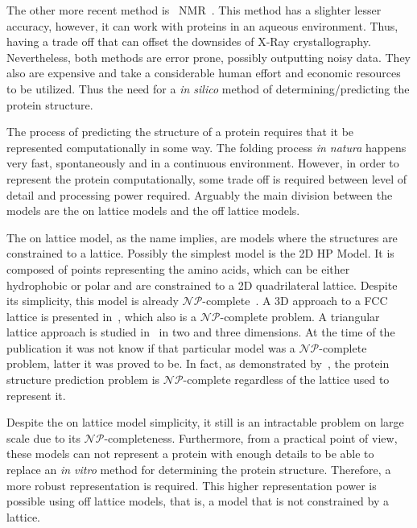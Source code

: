 The other more recent method is ~\ac{NMR}~\cite{nelson2008lehninger}. This
method has a slighter lesser accuracy, however, it can work with proteins in an
aqueous environment. Thus, having a trade off that can offset the downsides of
X-Ray crystallography. Nevertheless, both methods are error prone, possibly
outputting noisy data. They also are expensive and take a considerable human
effort and economic resources to be utilized.  Thus the need for a \textit{in
silico} method of determining/predicting the protein structure.

The process of predicting the structure of a protein requires that it be
represented computationally in some way. The folding process \textit{in natura}
happens very fast, spontaneously and in a continuous environment. However, in
order to represent the protein computationally, some trade off is required
between level of detail and processing power required. Arguably the main
division between the models are the on lattice models and the off lattice
models.

The on lattice model, as the name implies, are models where the structures are
constrained to a lattice. Possibly the simplest model is the 2D \ac{HP} Model.
It is composed of points representing the amino acids, which can be either
hydrophobic or polar and are constrained to a 2D quadrilateral lattice. Despite
its simplicity, this model is already
$\mathcal{NP}$-complete~\cite{berger1998protein}. A 3D approach to a \ac{FCC}
lattice is presented in~\cite{hoque2007protein}, which also is a
$\mathcal{NP}$-complete problem. A triangular lattice approach is studied
in~\cite{agarwala1997local} in two and three dimensions. At the time of the
publication it was not know if that particular model was a
$\mathcal{NP}$-complete problem, latter it was proved to be. In fact, as
demonstrated by~\cite{hart1997robust}, the protein structure prediction problem
is $\mathcal{NP}$-complete regardless of the lattice used to represent it.

Despite the on lattice model simplicity, it still is an intractable problem on
large scale due to its $\mathcal{NP}$-completeness. Furthermore, from a
practical point of view, these models can not represent a protein with enough
details to be able to replace an \textit{in vitro} method for determining the
protein structure. Therefore, a more robust representation is required. This
higher representation power is possible using off lattice models, that is, a
model that is not constrained by a lattice.

